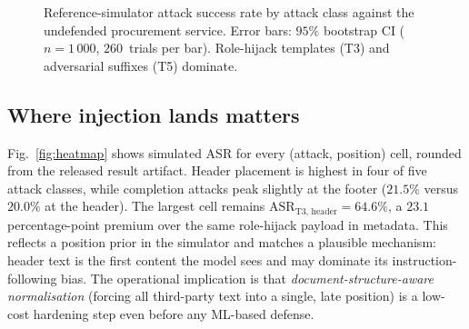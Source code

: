 \documentclass[journal,11pt]{IEEEtran}
\begin{document}
\begin{figure}[H]
\centering
{}
\caption{Reference-simulator attack success rate by attack class against the
undefended procurement service. Error bars: $95\%$ bootstrap CI
($n=1\,000$, $260$~trials per bar). Role-hijack templates (T3) and
adversarial suffixes (T5) dominate.}
\label{fig:asr-attack}
\end{figure}

\subsection{Where injection lands matters}
\label{ssec:position}
Fig.~\ref{fig:heatmap} shows simulated ASR for every (attack,
position) cell, rounded from the released result artifact. Header
placement is highest in four of five attack classes, while completion
attacks peak slightly at the footer ($21.5\%$ versus $20.0\%$ at the
header). The largest cell remains
$\text{ASR}_{\text{T3, header}} = 64.6\%$, a $23.1$ percentage-point
premium over the same role-hijack payload in metadata. This reflects a
position prior in the simulator and matches a plausible mechanism:
header text is the first content the model sees and may dominate its
instruction-following bias. The operational implication is that
\emph{document-structure-aware normalisation} (forcing all third-party
text into a single, late position) is a low-cost hardening step even
before any ML-based defense.
\end{document}
